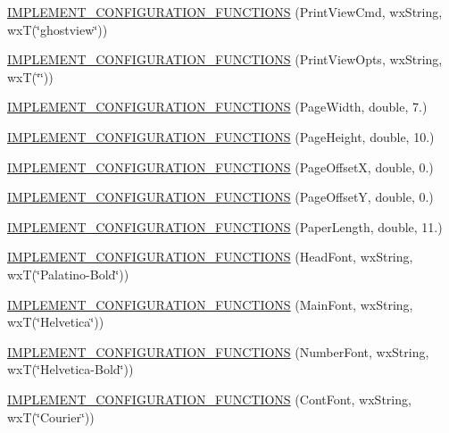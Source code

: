 \begin{DoxyCompactItemize}
\item 
\hyperlink{a00190_a732cd1083205724959f83fb5d43b57de}{I\-M\-P\-L\-E\-M\-E\-N\-T\-\_\-\-C\-O\-N\-F\-I\-G\-U\-R\-A\-T\-I\-O\-N\-\_\-\-F\-U\-N\-C\-T\-I\-O\-N\-S} (Print\-View\-Cmd, wx\-String, wx\-T(\char`\"{}ghostview\char`\"{}))
\item 
\hyperlink{a00190_a18ff5c35b42ed64b14ecdeabf7466b58}{I\-M\-P\-L\-E\-M\-E\-N\-T\-\_\-\-C\-O\-N\-F\-I\-G\-U\-R\-A\-T\-I\-O\-N\-\_\-\-F\-U\-N\-C\-T\-I\-O\-N\-S} (Print\-View\-Opts, wx\-String, wx\-T(\char`\"{}\char`\"{}))
\item 
\hyperlink{a00190_a057f8b34fe2a3235e8337387bc4f7f82}{I\-M\-P\-L\-E\-M\-E\-N\-T\-\_\-\-C\-O\-N\-F\-I\-G\-U\-R\-A\-T\-I\-O\-N\-\_\-\-F\-U\-N\-C\-T\-I\-O\-N\-S} (Page\-Width, double, 7.)
\item 
\hyperlink{a00190_a3fc3cb9ae2ae38dde0f65039fb688f09}{I\-M\-P\-L\-E\-M\-E\-N\-T\-\_\-\-C\-O\-N\-F\-I\-G\-U\-R\-A\-T\-I\-O\-N\-\_\-\-F\-U\-N\-C\-T\-I\-O\-N\-S} (Page\-Height, double, 10.)
\item 
\hyperlink{a00190_a2dc0869a50e68e0700f3eed2fb6cf913}{I\-M\-P\-L\-E\-M\-E\-N\-T\-\_\-\-C\-O\-N\-F\-I\-G\-U\-R\-A\-T\-I\-O\-N\-\_\-\-F\-U\-N\-C\-T\-I\-O\-N\-S} (Page\-Offset\-X, double, 0.)
\item 
\hyperlink{a00190_af41037900e12749c3ccea961766d0e40}{I\-M\-P\-L\-E\-M\-E\-N\-T\-\_\-\-C\-O\-N\-F\-I\-G\-U\-R\-A\-T\-I\-O\-N\-\_\-\-F\-U\-N\-C\-T\-I\-O\-N\-S} (Page\-Offset\-Y, double, 0.)
\item 
\hyperlink{a00190_a92912857cf7c064178df7fbe0f325b35}{I\-M\-P\-L\-E\-M\-E\-N\-T\-\_\-\-C\-O\-N\-F\-I\-G\-U\-R\-A\-T\-I\-O\-N\-\_\-\-F\-U\-N\-C\-T\-I\-O\-N\-S} (Paper\-Length, double, 11.)
\item 
\hyperlink{a00190_ad7d789b42b03878702092ef51503894f}{I\-M\-P\-L\-E\-M\-E\-N\-T\-\_\-\-C\-O\-N\-F\-I\-G\-U\-R\-A\-T\-I\-O\-N\-\_\-\-F\-U\-N\-C\-T\-I\-O\-N\-S} (Head\-Font, wx\-String, wx\-T(\char`\"{}Palatino-\/Bold\char`\"{}))
\item 
\hyperlink{a00190_a3cf8840d6fe3cd31bf34b389db4ed793}{I\-M\-P\-L\-E\-M\-E\-N\-T\-\_\-\-C\-O\-N\-F\-I\-G\-U\-R\-A\-T\-I\-O\-N\-\_\-\-F\-U\-N\-C\-T\-I\-O\-N\-S} (Main\-Font, wx\-String, wx\-T(\char`\"{}Helvetica\char`\"{}))
\item 
\hyperlink{a00190_a18d4a4afdb26e9969cbf3e7ad1cd637d}{I\-M\-P\-L\-E\-M\-E\-N\-T\-\_\-\-C\-O\-N\-F\-I\-G\-U\-R\-A\-T\-I\-O\-N\-\_\-\-F\-U\-N\-C\-T\-I\-O\-N\-S} (Number\-Font, wx\-String, wx\-T(\char`\"{}Helvetica-\/Bold\char`\"{}))
\item 
\hyperlink{a00190_a19b884b64697b5bae93e9305d8e1fa17}{I\-M\-P\-L\-E\-M\-E\-N\-T\-\_\-\-C\-O\-N\-F\-I\-G\-U\-R\-A\-T\-I\-O\-N\-\_\-\-F\-U\-N\-C\-T\-I\-O\-N\-S} (Cont\-Font, wx\-String, wx\-T(\char`\"{}Courier\char`\"{}))

\end{DoxyCompactItemize}
